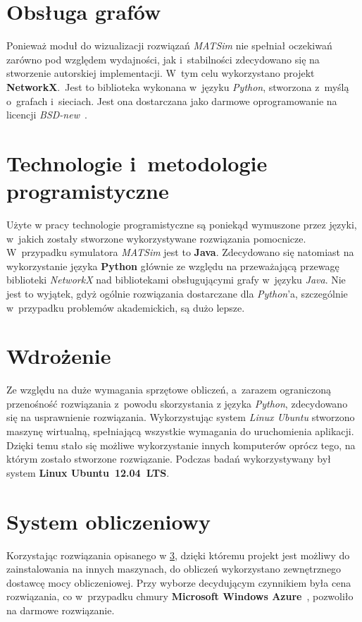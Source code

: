 \documentclass[twoside,12pt]{report}
\begin{document}
\section{Obsługa grafów}

Ponieważ moduł do wizualizacji rozwiązań \textit{MATSim} nie spełniał  oczekiwań zarówno pod względem wydajności, jak i~stabilności zdecydowano się na stworzenie autorskiej implementacji. W~tym celu wykorzystano projekt \textbf{NetworkX}.~Jest to biblioteka wykonana w~języku \textit{Python}, stworzona z~myślą o~grafach i~sieciach. Jest ona dostarczana jako darmowe oprogramowanie na licencji \textit{BSD-new}~\cite{networkx}. 

\section{Technologie i~metodologie programistyczne}

Użyte w pracy technologie programistyczne są poniekąd wymuszone przez języki, w~jakich zostały stworzone wykorzystywane rozwiązania pomocnicze. W~przypadku symulatora \textit{MATSim} jest to \textbf{Java}. Zdecydowano się natomiast na wykorzystanie języka \textbf{Python} głównie ze względu na przeważającą przewagę biblioteki \textit{NetworkX} nad bibliotekami obsługującymi grafy w~języku \textit{Java}. Nie jest to wyjątek, gdyż ogólnie rozwiązania dostarczane dla \textit{Python}'a, szczególnie w~przypadku problemów akademickich, są dużo lepsze.  

\section{Wdrożenie}\label{sec:wdrozenie}

Ze względu na duże wymagania sprzętowe obliczeń, a~zarazem ograniczoną przenośność rozwiązania z~powodu skorzystania z języka \textit{Python}, zdecydowano się na usprawnienie rozwiązania. Wykorzystując system \textit{Linux Ubuntu} stworzono maszynę wirtualną, spełniającą wszystkie wymagania do uruchomienia aplikacji. Dzięki temu stało się możliwe wykorzystanie innych komputerów oprócz tego, na którym zostało stworzone rozwiązanie. Podczas badań wykorzystywany był system \textbf{Linux Ubuntu~12.04~LTS}\cite{ubuntu}.

\section{System obliczeniowy}

Korzystając rozwiązania opisanego w \ref{sec:wdrozenie}, dzięki któremu projekt jest możliwy do zainstalowania na innych maszynach, do obliczeń wykorzystano zewnętrznego dostawcę mocy obliczeniowej. Przy wyborze decydującym czynnikiem była cena rozwiązania, co w~przypadku chmury\textbf{ Microsoft Windows Azure}~\cite{azure}, pozwoliło na darmowe rozwiązanie.
\end{document}
